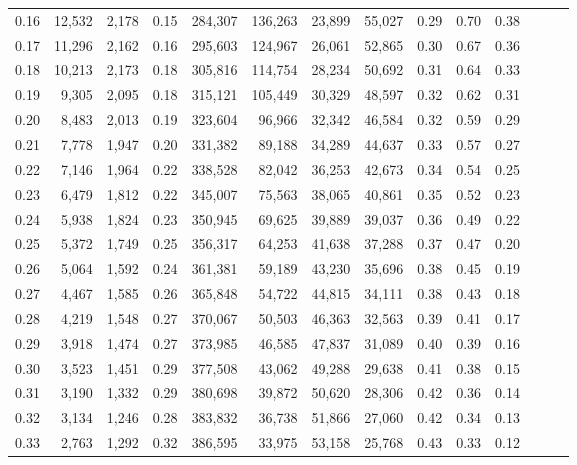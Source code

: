 \begin{tabular}{rrrrrrrrrrrrrr}
0.16 &  12,532 &  2,178 &  0.15 &  284,307 &  136,263 &  23,899 &  55,027 &  0.29 &  0.70 &      0.38 \\
0.17 &  11,296 &  2,162 &  0.16 &  295,603 &  124,967 &  26,061 &  52,865 &  0.30 &  0.67 &      0.36 \\
0.18 &  10,213 &  2,173 &  0.18 &  305,816 &  114,754 &  28,234 &  50,692 &  0.31 &  0.64 &      0.33 \\
0.19 &   9,305 &  2,095 &  0.18 &  315,121 &  105,449 &  30,329 &  48,597 &  0.32 &  0.62 &      0.31 \\
0.20 &   8,483 &  2,013 &  0.19 &  323,604 &   96,966 &  32,342 &  46,584 &  0.32 &  0.59 &      0.29 \\
0.21 &   7,778 &  1,947 &  0.20 &  331,382 &   89,188 &  34,289 &  44,637 &  0.33 &  0.57 &      0.27 \\
0.22 &   7,146 &  1,964 &  0.22 &  338,528 &   82,042 &  36,253 &  42,673 &  0.34 &  0.54 &      0.25 \\
0.23 &   6,479 &  1,812 &  0.22 &  345,007 &   75,563 &  38,065 &  40,861 &  0.35 &  0.52 &      0.23 \\
0.24 &   5,938 &  1,824 &  0.23 &  350,945 &   69,625 &  39,889 &  39,037 &  0.36 &  0.49 &      0.22 \\
0.25 &   5,372 &  1,749 &  0.25 &  356,317 &   64,253 &  41,638 &  37,288 &  0.37 &  0.47 &      0.20 \\
0.26 &   5,064 &  1,592 &  0.24 &  361,381 &   59,189 &  43,230 &  35,696 &  0.38 &  0.45 &      0.19 \\
0.27 &   4,467 &  1,585 &  0.26 &  365,848 &   54,722 &  44,815 &  34,111 &  0.38 &  0.43 &      0.18 \\
0.28 &   4,219 &  1,548 &  0.27 &  370,067 &   50,503 &  46,363 &  32,563 &  0.39 &  0.41 &      0.17 \\
0.29 &   3,918 &  1,474 &  0.27 &  373,985 &   46,585 &  47,837 &  31,089 &  0.40 &  0.39 &      0.16 \\
0.30 &   3,523 &  1,451 &  0.29 &  377,508 &   43,062 &  49,288 &  29,638 &  0.41 &  0.38 &      0.15 \\
0.31 &   3,190 &  1,332 &  0.29 &  380,698 &   39,872 &  50,620 &  28,306 &  0.42 &  0.36 &      0.14 \\
0.32 &   3,134 &  1,246 &  0.28 &  383,832 &   36,738 &  51,866 &  27,060 &  0.42 &  0.34 &      0.13 \\
0.33 &   2,763 &  1,292 &  0.32 &  386,595 &   33,975 &  53,158 &  25,768 &  0.43 &  0.33 &      0.12 \\

\end{tabular}

